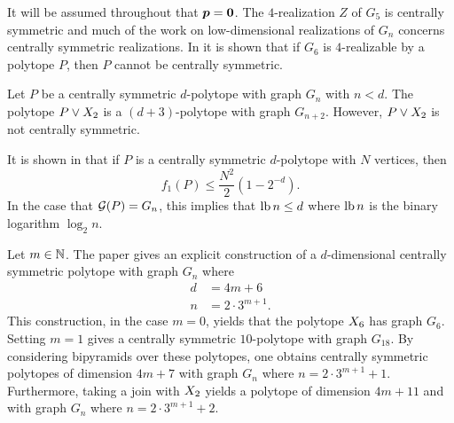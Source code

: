             It will be assumed throughout that \(\bm{p}=\bm{0}\).  The \(4\)-realization \(Z\) of \(G_5\) is centrally symmetric and much of the work on low-dimensional realizations of \(G_n\) concerns centrally symmetric realizations.   In \cite{GrunBook} it is shown that if \(G_6\) is \(4\)-realizable by a polytope \(P\), then \(P\) cannot be centrally symmetric.

            Let \(P\) be a centrally symmetric \(d\)-polytope with graph \(G_n\) with \(n<d\).  The polytope \(P\vee X_{2}\) is a \((d+3)\)-polytope with graph \(G_{n+2}\).  However, \(P\vee X_{2}\) is not centrally symmetric.

            It is shown in \cite{BarNov:CSCyclic} that if \(P\) is a  centrally symmetric \(d\)-polytope with \(N\) vertices, then
                \[
                    f_1(P)
                        \le
                            \frac{N^2}2(1-2^{-d}).
                \]
            In the case that \(\mathcal{G}(P)=G_n\), this implies that \(\operatorname{lb} n\le d\) where \(\operatorname{lb} n\) is the binary logarithm \(\log_2 n\).

            Let \(m\in\mathbb{N}\).  The paper \cite{BarLeeNov:Many} gives an explicit construction of a \(d\)-dimensional centrally symmetric polytope with graph \(G_n\) where
                \begin{align*}
                    d
                        &=
                            4m+6\\
                    n
                        &=
                            2\cdot3^{m+1}.
                \end{align*}
            This construction, in the case \(m=0\), yields that the polytope \(X_{6}\) has graph \(G_6\).  Setting \(m=1\) gives a centrally symmetric \(10\)-polytope with graph \(G_{18}\).  By considering bipyramids over these polytopes, one obtains centrally symmetric polytopes of dimension \(4m+7\) with graph \(G_n\) where \(n=2\cdot3^{m+1}+1\).  Furthermore, taking a join  with \(X_{2}\) yields a polytope of dimension \(4m+11\) and with graph \(G_n\) where \(n=2\cdot3^{m+1}+2\). 